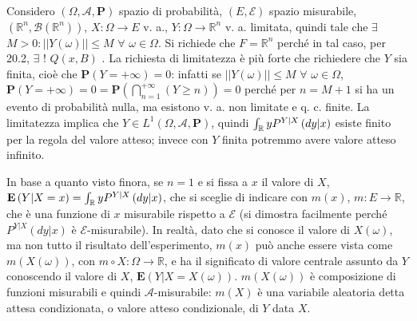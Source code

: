 \documentclass{article}
\begin{document}
Considero $\left( \Omega ,\mathcal{A},\mathbf{P}\right) $ spazio di
probabilit\`{a}, $\left( E,\mathcal{E}\right) $ spazio misurabile, $\left( 
\mathbb{R}
^{n},\mathcal{B}\left( 
\mathbb{R}
^{n}\right) \right) $, $X:\Omega \rightarrow E$ v. a., $Y:\Omega \rightarrow 
\mathbb{R}
^{n}$ v. a. limitata, quindi tale che $\exists $ $M>0:\left\vert \left\vert
Y\left( \omega \right) \right\vert \right\vert \leq M$ $\forall $ $\omega
\in \Omega $. Si richiede che $F=%
\mathbb{R}
^{n}$ perch\'{e} in tal caso, per 20.2, $\exists $ $!$ $Q\left( x,B\right) $%
. La richiesta di limitatezza \`{e} pi\`{u} forte che richiedere che $Y$ sia
finita, cio\`{e} che $\mathbf{P}\left( Y=+\infty \right) =0$: infatti se $%
\left\vert \left\vert Y\left( \omega \right) \right\vert \right\vert \leq M$ 
$\forall $ $\omega \in \Omega $, $\mathbf{P}\left( Y=+\infty \right) =0=%
\mathbf{P}\left( \bigcap_{n=1}^{+\infty }\left( Y\geq n\right) \right) =0$
perch\'{e} per $n=M+1$ si ha un evento di probabilit\`{a} nulla, ma esistono
v. a. non limitate e q. c. finite. La limitatezza implica che $Y\in
L^{1}\left( \Omega ,\mathcal{A},\mathbf{P}\right) $, quindi $\int_{%
\mathbb{R}
}yP^{Y|X}\left( dy|x\right) $ esiste finito per la regola del valore atteso;
invece con $Y$ finita potremmo avere valore atteso infinito.

In base a quanto visto finora, se $n=1$ e si fissa a $x$ il valore di $X$, $%
\mathbf{E}\left( Y|X=x\right) =\int_{%
\mathbb{R}
}yP^{Y|X}\left( dy|x\right) $, che si sceglie di indicare con $m\left(
x\right) $, $m:E\rightarrow 
\mathbb{R}
$, che \`{e} una funzione di $x$ misurabile rispetto a $\mathcal{E}$ (si
dimostra facilmente perch\'{e} $P^{Y|X}\left( dy|x\right) $ \`{e} $\mathcal{E%
}$-misurabile). In realt\`{a}, dato che si conosce il valore di $X\left(
\omega \right) $, ma non tutto il risultato dell'esperimento, $m\left(
x\right) $ pu\`{o} anche essere vista come $m\left( X\left( \omega \right)
\right) $, con $m\circ X:\Omega \rightarrow 
\mathbb{R}
$, e ha il significato di valore centrale assunto da $Y$ conoscendo il
valore di $X$, $\mathbf{E}\left( Y|X=X\left( \omega \right) \right) $. $%
m\left( X\left( \omega \right) \right) $ \`{e} composizione di funzioni
misurabili e quindi $\mathcal{A}$-misurabile: $m\left( X\right) $ \`{e} una
variabile aleatoria detta attesa condizionata, o valore atteso condizionale,
di $Y$ data $X$.
\end{document}
